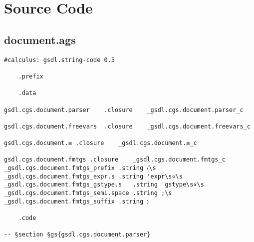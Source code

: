 \documentclass{report}
\begin{document}
\chapter{Source Code}

\section{document.ags}

\begin{verbatim}
#calculus: gsdl.string-code 0.5

	.prefix

	.data

gsdl.cgs.document.parser	.closure	_gsdl.cgs.document.parser_c

gsdl.cgs.document.freevars	.closure	_gsdl.cgs.document.freevars_c

gsdl.cgs.document.≡	.closure	_gsdl.cgs.document.≡_c

gsdl.cgs.document.fmtgs	.closure	_gsdl.cgs.document.fmtgs_c
_gsdl.cgs.document.fmtgs_prefix	.string	〈\s
_gsdl.cgs.document.fmtgs_expr.s	.string	'expr\s∝\s
_gsdl.cgs.document.fmtgs_gstype.s	.string	'gstype\s∝\s
_gsdl.cgs.document.fmtgs_semi.space	.string	;\s
_gsdl.cgs.document.fmtgs_suffix	.string	〉

	.code

-- §section §gs{gsdl.cgs.document.parser}


\end{verbatim}
\end{document}
